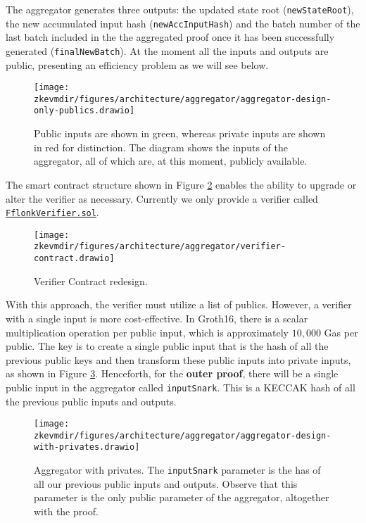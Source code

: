 The aggregator generates three outputs: the updated state root (\texttt{newStateRoot}), the new accumulated input hash (\texttt{newAccInputHash}) and the batch number of the last batch included in the the aggregated proof once it has been successfully generated (\texttt{finalNewBatch}). At the moment all the inputs and outputs are public, presenting an efficiency problem as we will see below.


\begin{figure}[h]
\centering
\texttt{[image: \\zkevmdir/figures/architecture/aggregator/aggregator-design-only-publics.drawio]}
\caption{Public inputs are shown in green, whereas private inputs are shown in red for distinction. The diagram shows the inputs of the aggregator, all of which are, at this moment, publicly available. }
\label{fig:aggregator-only-publics}
\end{figure}


The smart contract structure shown in Figure \ref{fig:verifier-smart-contract} enables the ability to upgrade or alter the verifier as necessary. Currently we only provide a verifier called \href{https://github.com/0xPolygonHermez/zkevm-contracts/blob/main/contracts/verifiers/FflonkVerifier.sol}{\texttt{FflonkVerifier.sol}}.

\begin{figure}[h]
\centering
\texttt{[image: \\zkevmdir/figures/architecture/aggregator/verifier-contract.drawio]}
\caption{Verifier Contract redesign.}
\label{fig:verifier-smart-contract}
\end{figure}


With this approach, the verifier must utilize a list of publics. However, a verifier with a single input is more cost-effective. In Groth16, there is a scalar multiplication operation per public input, which is approximately $10,000$ Gas per public. The key is to create a single public input that is the hash of all the previous public keys and then transform these public inputs into private inputs, as shown in Figure \ref{fig:aggregator-with-privates}. Henceforth, for the \textbf{outer proof}, there will be a single public input in the aggregator called \texttt{inputSnark}. This is a KECCAK hash of all the previous public inputs and outputs.


\begin{figure}[h]
\centering
\texttt{[image: \\zkevmdir/figures/architecture/aggregator/aggregator-design-with-privates.drawio]}
\caption{Aggregator with privates. The \texttt{inputSnark} parameter is the has of all our previous public inputs and outputs. Observe that this parameter is the only public parameter of the aggregator, altogether with the proof. }
\label{fig:aggregator-with-privates}
\end{figure}


